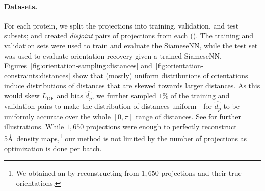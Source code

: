 \paragraph{Datasets.}
For each protein, we split the projections into training, validation, and test subsets; and created \textit{disjoint} pairs of projections from each ().
The training and validation sets were used to train and evaluate the SiameseNN, while the test set was used to evaluate orientation recovery given a trained SiameseNN.
Figures~\ref{fig:orientation-sampling:distances} and~\ref{fig:orientation-constraints:distances} show that (mostly) uniform distributions of orientations induce distributions of distances that are skewed towards larger distances.
As this would skew $L_\text{DE}$ and bias $\widehat{d_p}$, we further sampled $1\%$ of the training and validation pairs to make the distribution of distances uniform---for $\widehat{d_p}$ to be uniformly accurate over the whole $[0,\pi]$ range of distances.
See  for further illustrations.
While $1,650$ projections were enough to perfectly reconstruct 5\AA\ density maps,\footnote{We obtained an  by reconstructing from $1,650$ projections and their true orientations.} our method is not limited by the number of projections as optimization is done per batch.

